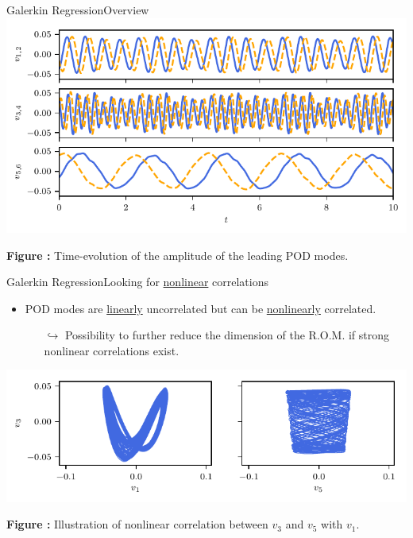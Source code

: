 \documentclass[usenames,dvipsnames,svgnames,10pt,aspectratio=169]{beamer}
\begin{document}
\begin{frame}[t, c]{Galerkin Regression}{Overview}
	\centering
	\includegraphics[width=.66\textwidth]{singular_chronos}

	\textbf{Figure :} Time-evolution of the amplitude of the leading POD modes.

	\vspace{1cm}
\end{frame}

\begin{frame}[t, c]{Galerkin Regression}{Looking for \underline{nonlinear} correlations}

	\begin{itemize}
		\item POD modes are \underline{linearly} uncorrelated but can be \underline{nonlinearly} correlated.
		\begin{itemize}
			\item[$\hookrightarrow$] Possibility to further reduce the dimension of the R.O.M. if strong nonlinear correlations exist.
		\end{itemize}
	\end{itemize}

	\begin{center}
		\includegraphics[width=.7\textwidth]{pca_nonlinear_correlation}

		\textbf{Figure :} Illustration of nonlinear correlation between $v_3$ and $v_5$ with $v_1$.
	\end{center}
\end{frame}
\end{document}
